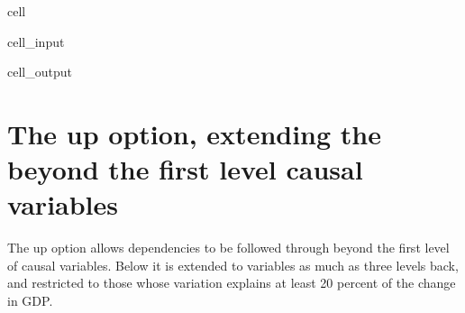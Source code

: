 \documentclass[letterpaper,10pt,english]{jupyterBook}
\begin{document}
\begin{sphinxuseclass}{cell}\begin{sphinxVerbatimInput}

\begin{sphinxuseclass}{cell_input}
\begin{sphinxVerbatim}[commandchars=\\\{\}]
\end{sphinxVerbatim}

\end{sphinxuseclass}\end{sphinxVerbatimInput}
\begin{sphinxVerbatimOutput}

\begin{sphinxuseclass}{cell_output}
\noindent{}

\end{sphinxuseclass}\end{sphinxVerbatimOutput}

\end{sphinxuseclass}

\section{The up option, extending the  beyond the first level causal variables}
\label{\detokenize{content/06_ModelAnalytics/ModelStructure:the-up-option-extending-the-tracepre-beyond-the-first-level-causal-variables}}
\sphinxAtStartPar
The up option allows  dependencies to be followed through beyond the first level of causal variables.  Below it is extended to variables as much as three levels back, and restricted to those whose variation explains at least 20 percent of the change in GDP.
\end{document}
